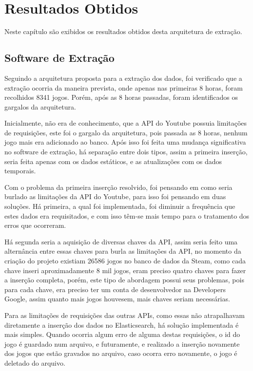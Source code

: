 \chapter[Resultados Obtidos]{Resultados Obtidos}
Neste capítulo são exibidos os resultados obtidos desta arquitetura de extração.

\section{Software de Extração}
Seguindo a arquitetura proposta para a extração dos dados, foi verificado que a extração ocorria da maneira prevista, onde apenas nas primeiras 8 horas, foram recolhidos 8341 jogos. Porém, após as 8 horas passadas, foram identificados os gargalos da arquitetura. 

Inicialmente, não era de conhecimento, que a API do Youtube possuia limitações de requisições, este foi o gargalo da arquitetura, pois passada as 8 horas, nenhum jogo mais era adicionado ao banco. Após isso foi feita uma mudança significativa no software de extração, há separação entre dois tipos, assim a primeira inserção, seria feita apenas com os dados estáticos, e as atualizações com os dados temporais.

Com o problema da primeira inserção resolvido, foi pensando em como seria burlado as limitações da API do Youtube, para isso foi pensando em duas soluções. Há primeira, a qual foi implementada, foi diminuir a frequência que estes dados era requisitados, e com isso têm-se mais tempo para o tratamento dos erros que ocorreram. 

Há segunda seria a aquisição de diversas chaves da API, assim seria feito uma alternância entre essas chaves para burla as limitações da API, no momento da criação do projeto existiam 26586 jogos no banco de dados da Steam, como cada chave inseri aproximadamente 8 mil jogos, eram preciso quatro chaves para fazer a inserção completa, porém, este tipo de abordagem possui seus problemas, pois para cada chave, era preciso ter um conta de desenvolvedor na Developers Google, assim quanto mais jogos houvesem, mais chaves seriam necessárias.

Para as limitações de requisições das outras APIs, como essas não atrapalhavam diretamente a inserção dos dados no Elasticsearch, há solução implementada é mais simples. Quando ocorria algum erro de alguma destas requisições, o id do jogo é guardado num arquivo, e futuramente, e realizado a inserção novamente dos jogos que estão gravados no arquivo, caso ocorra erro novamente, o jogo é deletado do arquivo.

